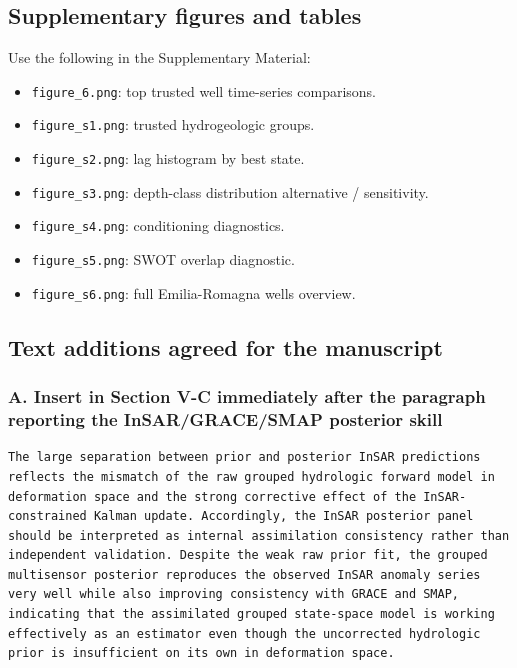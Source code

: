 \subsection*{Supplementary figures and tables}

Use the following in the Supplementary Material:
\begin{itemize}
    \item \texttt{figure\_6.png}: top trusted well time-series comparisons.
    \item \texttt{figure\_s1.png}: trusted hydrogeologic groups.
    \item \texttt{figure\_s2.png}: lag histogram by best state.
    \item \texttt{figure\_s3.png}: depth-class distribution alternative / sensitivity.
    \item \texttt{figure\_s4.png}: conditioning diagnostics.
    \item \texttt{figure\_s5.png}: SWOT overlap diagnostic.
    \item \texttt{figure\_s6.png}: full Emilia-Romagna wells overview.
\end{itemize}

\subsection*{Text additions agreed for the manuscript}

\subsubsection*{A. Insert in Section V-C immediately after the paragraph reporting the InSAR/GRACE/SMAP posterior skill}

\begin{verbatim}
The large separation between prior and posterior InSAR predictions reflects the mismatch of the raw grouped hydrologic forward model in deformation space and the strong corrective effect of the InSAR-constrained Kalman update. Accordingly, the InSAR posterior panel should be interpreted as internal assimilation consistency rather than independent validation. Despite the weak raw prior fit, the grouped multisensor posterior reproduces the observed InSAR anomaly series very well while also improving consistency with GRACE and SMAP, indicating that the assimilated grouped state-space model is working effectively as an estimator even though the uncorrected hydrologic prior is insufficient on its own in deformation space.
\end{verbatim}


